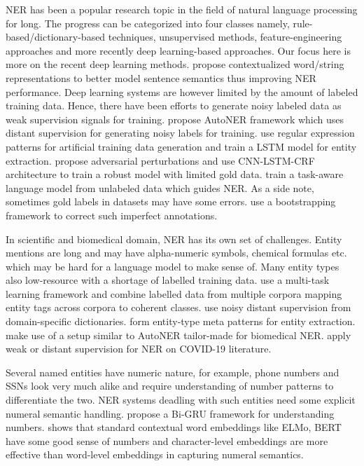 NER has been a popular research topic in the field of natural language processing for long. The progress can be categorized into four classes namely, rule-based/dictionary-based techniques\cite{quimbaya2016named}, unsupervised methods\cite{zhang2013unsupervised}, feature-engineering approaches\cite{mcnamee2002entity} and more recently deep learning-based approaches\cite{torfi2020natural, li2020survey}. Our focus here is more on the recent deep learning methods. \cite{devlin2018bert, peters2018deep, akbik2018contextual} propose contextualized word/string representations to better model sentence semantics thus improving NER performance. Deep learning systems are however limited by the amount of labeled training data. Hence, there have been efforts to generate noisy labeled data as weak supervision signals for training. \cite{shang2018learning} propose AutoNER framework which uses distant supervision for generating noisy labels for training. \cite{arora2017extracting} use regular expression patterns for artificial training data generation and train a LSTM model for entity extraction. \cite{zhou2019dual} propose adversarial perturbations and use CNN-LSTM-CRF architecture to train a robust model with limited gold data. \cite{liu2018empower, liu2018efficient} train a task-aware language model from unlabeled data which guides NER. As a side note, sometimes gold labels in datasets may have some errors. \cite{wang2019crossweigh} use a bootstrapping framework to correct such imperfect annotations.

In scientific and biomedical domain, NER has its own set of challenges. Entity mentions are long and may have alpha-numeric symbols, chemical formulas etc. which may be hard for a language model to make sense of. Many entity types also low-resource with a shortage of labelled training data. \cite{wang2019cross} use a multi-task learning framework and combine labelled data from multiple corpora mapping entity tags across corpora to coherent classes. \cite{wang2020pattern} use noisy distant supervision from domain-specific dictionaries. \cite{wang2018penner} form entity-type meta patterns for entity extraction. \cite{wang2019distantly} make use of a setup similar to AutoNER\cite{shang2018learning} tailor-made for biomedical NER. \cite{wang2020fine, wang2020comprehensive} apply weak or distant supervision for NER on COVID-19 literature.

Several named entities have numeric nature, for example, phone numbers and SSNs look very much alike and require understanding of number patterns to differentiate the two. NER systems deadling with such entities need some explicit numeral semantic handling. \cite{chen2019numeracy} propose a Bi-GRU framework for understanding numbers. \cite{wallace2019nlp} shows that standard contextual word embeddings like ELMo\cite{peters2018deep}, BERT\cite{devlin2018bert} have some good sense of numbers and character-level embeddings are more effective than word-level embeddings in capturing numeral semantics.
